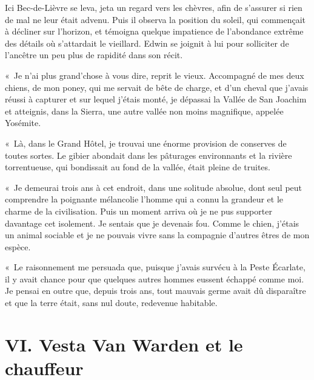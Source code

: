 \documentclass[french,twoside]{book} %
\newcommand\chapteropen{} %
\newcommand\chapterclose{} %
\begin{document}
Ici Bec-de-Lièvre se leva, jeta un regard vers les chèvres, afin de s’assurer si rien de mal ne leur était advenu. Puis il observa la position du soleil, qui commençait à décliner sur l’horizon, et témoigna quelque impatience de l’abondance extrême des détails où s’attardait le vieillard. Edwin se joignit à lui pour solliciter de l’ancêtre un peu plus de rapidité dans son récit.\par
« Je n’ai plus grand’chose à vous dire, reprit le vieux. Accompagné de mes deux chiens, de mon poney, qui me servait de bête de charge, et d’un cheval que j’avais réussi à capturer et sur lequel j’étais monté, je dépassai la Vallée de San Joachim et atteignis, dans la Sierra, une autre vallée non moins magnifique, appelée Yosémite.\par
« Là, dans le Grand Hôtel, je trouvai une énorme provision de conserves de toutes sortes. Le gibier abondait dans les pâturages environnants et la rivière torrentueuse, qui bondissait au fond de la vallée, était pleine de truites.\par
« Je demeurai trois ans à cet endroit, dans une solitude absolue, dont seul peut comprendre la poignante mélancolie l’homme qui a connu la grandeur et le charme de la civilisation. Puis un moment arriva où je ne pus supporter davantage cet isolement. Je sentais que je devenais fou. Comme le chien, j’étais un animal sociable et je ne pouvais vivre sans la compagnie d’autres êtres de mon espèce.\par
« Le raisonnement me persuada que, puisque j’avais survécu à la Peste Écarlate, il y avait chance pour que quelques autres hommes eussent échappé comme moi. Je pensai en outre que, depuis trois ans, tout mauvais germe avait dû disparaître et que la terre était, sans nul doute, redevenue habitable.
\chapterclose


\chapteropen

\chapter[{VI. Vesta Van Warden et le chauffeur}]{VI. Vesta Van Warden et le chauffeur}
\renewcommand{\leftmark}{VI. Vesta Van Warden et le chauffeur}
\end{document}
